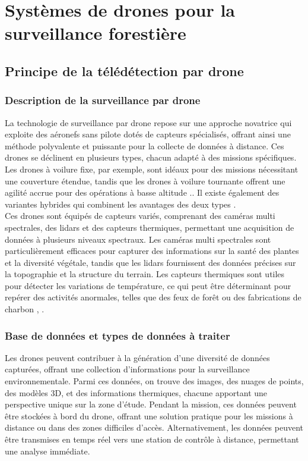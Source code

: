 \section{Systèmes de drones pour la surveillance forestière}
\subsection{Principe de la télédétection par drone}
\subsubsection{Description de la surveillance par drone}	
La technologie de surveillance par drone repose sur une approche novatrice qui exploite des aéronefs sans pilote dotés de capteurs spécialisés, offrant ainsi une méthode polyvalente et puissante pour la collecte de données à distance. Ces drones se déclinent en plusieurs types, chacun adapté à des missions spécifiques. Les drones à voilure fixe, par exemple, sont idéaux pour des missions nécessitant une couverture étendue, tandis que les drones à voilure tournante offrent une agilité accrue pour des opérations à basse altitude \cite{46}.. Il existe également des variantes hybrides qui combinent les avantages des deux types \cite{47}.
\\

Ces drones sont équipés de capteurs variés, comprenant des caméras multi spectrales, des lidars et des capteurs thermiques, permettant une acquisition de données à plusieurs niveaux spectraux. Les caméras multi spectrales sont particulièrement efficaces pour capturer des informations sur la santé des plantes et la diversité végétale, tandis que les lidars fournissent des données précises sur la topographie et la structure du terrain. Les capteurs thermiques sont utiles pour détecter les variations de température, ce qui peut être déterminant pour repérer des activités anormales, telles que des feux de forêt ou des fabrications de charbon \cite{48} , \cite{49}.

\subsubsection{Base de données et types de données à traiter}
Les drones peuvent contribuer à la génération d’une diversité de données capturées, offrant une collection d'informations pour la surveillance environnementale. Parmi ces données, on trouve des images, des nuages de points, des modèles 3D, et des informations thermiques, chacune apportant une perspective unique sur la zone d'étude. Pendant la mission, ces données peuvent être stockées à bord du drone, offrant une solution pratique pour les missions à distance ou dans des zones difficiles d'accès. Alternativement, les données peuvent être transmises en temps réel vers une station de contrôle à distance, permettant une analyse immédiate.
\\

